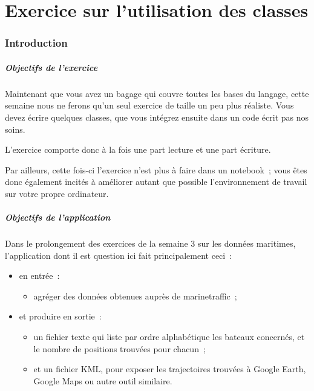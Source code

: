    
    
    
    

    

    \hypertarget{exercice-sur-lutilisation-des-classes}{%
\section{Exercice sur l'utilisation des
classes}\label{exercice-sur-lutilisation-des-classes}}

    \hypertarget{introduction}{%
\subsubsection{Introduction}\label{introduction}}

    \hypertarget{objectifs-de-lexercice}{%
\subparagraph{Objectifs de l'exercice}\label{objectifs-de-lexercice}}

    Maintenant que vous avez un bagage qui couvre toutes les bases du
langage, cette semaine nous ne ferons qu'un seul exercice de taille un
peu plus réaliste. Vous devez écrire quelques classes, que vous intégrez
ensuite dans un code écrit pas nos soins.

L'exercice comporte donc à la fois une part lecture et une part
écriture.

Par ailleurs, cette fois-ci l'exercice n'est plus à faire dans un
notebook~; vous êtes donc également incités à améliorer autant que
possible l'environnement de travail sur votre propre ordinateur.

    \hypertarget{objectifs-de-lapplication}{%
\subparagraph{Objectifs de
l'application}\label{objectifs-de-lapplication}}

    Dans le prolongement des exercices de la semaine 3 sur les données
maritimes, l'application dont il est question ici fait principalement
ceci~:

\begin{itemize}
\tightlist
\item
  en entrée~:

  \begin{itemize}
  \tightlist
  \item
    agréger des données obtenues auprès de marinetraffic~;
  \end{itemize}
\item
  et produire en sortie~:

  \begin{itemize}
  \tightlist
  \item
    un fichier texte qui liste par ordre alphabétique les bateaux
    concernés, et le nombre de positions trouvées pour chacun~;
  \item
    et un fichier KML, pour exposer les trajectoires trouvées à Google
    Earth, Google Maps ou autre outil similaire.
  \end{itemize}
\end{itemize}

